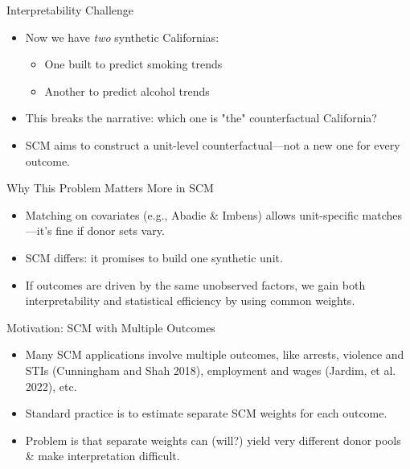 \documentclass{beamer}
\begin{document}
\begin{frame}{Interpretability Challenge}
  \begin{itemize}
    \item Now we have \textit{two} synthetic Californias:
    \begin{itemize}
      \item One built to predict smoking trends
      \item Another to predict alcohol trends
    \end{itemize}
    \item This breaks the narrative: which one is "the" counterfactual California?
    \item SCM aims to construct a unit-level counterfactual—not a new one for every outcome.
  \end{itemize}
\end{frame}

\begin{frame}{Why This Problem Matters More in SCM}
  \begin{itemize}
    \item Matching on covariates (e.g., Abadie \& Imbens) allows unit-specific matches—it's fine if donor sets vary.
    \item SCM differs: it promises to build one synthetic unit.
     \item If outcomes are driven by the same unobserved factors, we gain both interpretability and statistical efficiency by using common weights.
  \end{itemize}
\end{frame}


\begin{frame}{Motivation: SCM with Multiple Outcomes}
  \begin{itemize}
    \item Many SCM applications involve multiple outcomes, like arrests, violence and STIs (Cunningham and Shah 2018), employment and wages (Jardim, et al. 2022), etc.
    \item Standard practice is to estimate separate SCM weights for each outcome.
    \item Problem is that separate weights can (will?) yield very different donor pools \& make interpretation difficult.
  \end{itemize}
\end{frame}
\end{document}
